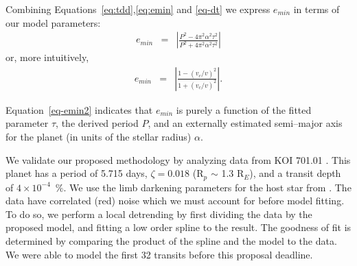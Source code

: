 Combining Equations~\ref{eq:tdd},\ref{eq:emin} and \ref{eq-dt} we express $e_{min}$ in terms of our model
parameters:
\begin{eqnarray}
e_{min} & = & \left| \frac{P^{2} - 4 \pi^{2} \alpha^{2} \tau^{2}}{P^{2} + 4 \pi^{2} \alpha^{2} \tau^{2}} \right| 
\label{eq-emin2}
\end{eqnarray}
or, more intuitively,
\begin{eqnarray}
e_{min} & = & \left| \frac{1 - (v_c/v)^2}{1 + (v_c/v)^2} \right| .
\label{eq-emin3}
\end{eqnarray}

Equation~\ref{eq-emin2} indicates that $e_{min}$ is purely a function
of the fitted parameter $\tau$, the derived period $P$, and an
externally estimated semi--major axis for the planet (in units of the
stellar radius) $\alpha$.  

%

\medskip
{\centerline{}}
\smallskip

We validate our proposed methodology by analyzing \kepler data from KOI
701.01 \citep[Kepler 62--b;][]{2013arXiv1304.7387B}.  This planet has
a period of 5.715 days, $\zeta = 0.018$ (R$_p$ $\sim$ 1.3 R$_E$), and
a transit depth of $4 \times 10^{-4}$~\%.  We use the limb darkening
parameters for the host star from
\cite{2010A&A...510A..21S}.  The \kepler data have correlated (red) noise
which we must account for before model fitting.  To do so, we perform
a local detrending by first dividing the data by the proposed model,
and fitting a low order spline to the result.  The goodness of fit is
determined by comparing the product of the spline and the model to the
data.  We were able to model the first 32 transits before this
proposal deadline.



